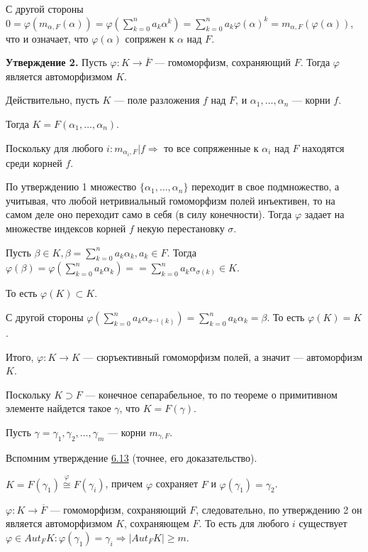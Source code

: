\documentclass[../main.tex]{subfiles}
\begin{document}
    С другой стороны $0 = \varphi(m_{\alpha, F}(\alpha))
    = \varphi(\sum\limits_{k=0}^n a_k \alpha^k)
    = \sum\limits_{k=0}^n a_k \varphi(\alpha)^k
    = m_{\alpha, F}(\varphi(\alpha))$,
    что и означает, что $\varphi(\alpha)$ сопряжен к $\alpha$ над $F$.

    \textbf{Утверждение 2.} Пусть $\varphi: K \to \overline{F}$
    --- гомоморфизм, сохраняющий $F$.
    Тогда $\varphi$ является автоморфизмом $K$.

    Действительно, пусть $K$ --- поле разложения $f$ над $F$, и
    $\alpha_1, \ldots, \alpha_n$ --- корни $f$.

    Тогда $K = F(\alpha_1, \ldots, \alpha_n)$.

    Поскольку для любого $i: m_{\alpha_i, F} | f \Rightarrow$
    то все сопряженные к $\alpha_i$ над $F$ находятся среди корней $f$.

    По утверждению 1 множество $\{\alpha_1, \ldots, \alpha_n\}$ переходит в свое
    подмножество, а учитывая, что любой нетривиальный гомоморфизм полей
    инъективен, то на самом деле оно переходит само в себя (в силу конечности).
    Тогда $\varphi$ задает на множестве индексов корней $f$ некую перестановку
    $\sigma$.

    Пусть $\beta \in K, \beta = \sum\limits_{k=0}^n a_k \alpha_k, a_k \in F$.
    Тогда $\varphi(\beta) = \varphi(\sum\limits_{k=0}^n a_k \alpha_k) =
    = \sum\limits_{k=0}^n a_k \alpha_{\sigma(k)} \in K$.

    То есть $\varphi(K) \subset K$.

    С другой стороны $\varphi(\sum\limits_{k = 0}^n a_k \alpha_{\sigma^{-1}(k)})
    = \sum\limits_{k = 0}^n a_k \alpha_k = \beta$. То есть $\varphi(K) = K$.

    Итого, $\varphi:K \to K$ --- сюръективный гомоморфизм полей, а значит
    --- автоморфизм $K$.

    Поскольку $K \supset F$ --- конечное сепарабельное, то по теореме о
    примитивном элементе найдется такое $\gamma$, что $K = F(\gamma)$.

    Пусть $\gamma = \gamma_1, \gamma_2, \ldots, \gamma_m$ --- корни
    $m_{\gamma, F}$.

    Вспомним утверждение \hyperlink{6.13}{6.13} (точнее, его доказательство).

    $K = F(\gamma_1) \stackrel{\varphi}{\cong} F(\gamma_i)$, причем $\varphi$
    сохраняет $F$ и $\varphi(\gamma_1) = \gamma_2$.

    $\varphi: K \to \overline{F}$ --- гомоморфизм, сохраняющий $F$,
    следовательно, по утверждению 2 он является автоморфизмом $K$, сохраняющем
    $F$. То есть для любого $i$ существует $\varphi \in Aut_FK:
    \varphi(\gamma_1) = \gamma_i \Rightarrow |Aut_FK| \geqslant m$.
\end{document}
